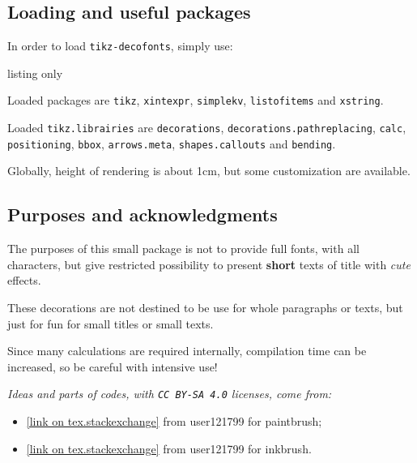 \documentclass[11pt,a4paper]{ltxdoc}
\begin{document}
\subsection{Loading and useful packages}

In order to load \texttt{tikz-decofonts}, simply use:

\begin{DemoCode}{listing only}
\usepackage{tikz-decofonts}
\end{DemoCode}

Loaded packages are \texttt{tikz}, \texttt{xintexpr}, \texttt{simplekv}, \texttt{listofitems} and \texttt{xstring}.

Loaded \texttt{tikz.librairies} are \texttt{decorations}, \texttt{decorations.pathreplacing}, \texttt{calc}, \texttt{positioning}, \texttt{bbox}, \texttt{arrows.meta}, \texttt{shapes.callouts} and \texttt{bending}.

\smallskip

Globally, height of rendering is about 1cm, but some customization are available.

\subsection{Purposes and acknowledgments}

The purposes of this small package is not to provide full fonts, with all characters, but give restricted possibility to present \textbf{short} texts of title with \textit{cute} effects.

\smallskip

These decorations are not destined to be use for whole paragraphs or texts, but just for fun for small titles or small texts.

\smallskip

Since many calculations are required internally, compilation time can be increased, so be careful with intensive use!

\smallskip

\textit{Ideas and parts of codes, with \texttt{CC\,BY-SA\,4.0} licenses, come from:}

\begin{itemize}
	\item \href{https://tex.stackexchange.com/questions/475141/simulating-paintbrush-strokes-in-tikz}{[link on tex.stackexchange]} from \textsf{user121799} for paintbrush;
	\item \href{https://tex.stackexchange.com/questions/460836/custom-line-cap-to-simulate-inked-line-in-tikz/460842#460842}{[link on tex.stackexchange]} from \textsf{user121799} for inkbrush.
\end{itemize}
\end{document}
